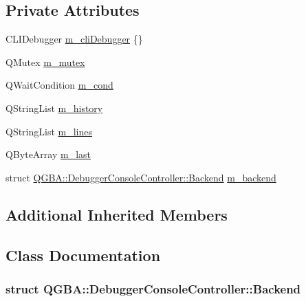 \subsection*{Private Attributes}
\begin{DoxyCompactItemize}
\item 
C\+L\+I\+Debugger \mbox{\hyperlink{class_q_g_b_a_1_1_debugger_console_controller_a8478029dc756b26ef415225ed61d18ff}{m\+\_\+cli\+Debugger}} \{\}
\item 
Q\+Mutex \mbox{\hyperlink{class_q_g_b_a_1_1_debugger_console_controller_a226ad563acafbfcb086defab145a7170}{m\+\_\+mutex}}
\item 
Q\+Wait\+Condition \mbox{\hyperlink{class_q_g_b_a_1_1_debugger_console_controller_a43988a77fa8a06372e9b94f6030b06d0}{m\+\_\+cond}}
\item 
Q\+String\+List \mbox{\hyperlink{class_q_g_b_a_1_1_debugger_console_controller_ab5ff5ce105d59435f616b429fe6ca0b5}{m\+\_\+history}}
\item 
Q\+String\+List \mbox{\hyperlink{class_q_g_b_a_1_1_debugger_console_controller_a05fed550c3eece88236ed0e3e3886ad1}{m\+\_\+lines}}
\item 
Q\+Byte\+Array \mbox{\hyperlink{class_q_g_b_a_1_1_debugger_console_controller_a3738efb4bd07c054e3cc04faece21e3a}{m\+\_\+last}}
\item 
struct \mbox{\hyperlink{class_q_g_b_a_1_1_debugger_console_controller_struct_q_g_b_a_1_1_debugger_console_controller_1_1_backend}{Q\+G\+B\+A\+::\+Debugger\+Console\+Controller\+::\+Backend}} \mbox{\hyperlink{class_q_g_b_a_1_1_debugger_console_controller_a88fed59f1d11fabe9270e808c75a1561}{m\+\_\+backend}}
\end{DoxyCompactItemize}
\subsection*{Additional Inherited Members}


\subsection{Class Documentation}
\label{struct_q_g_b_a_1_1_debugger_console_controller_1_1_backend}
\subsubsection{struct Q\+G\+BA\+:\+:Debugger\+Console\+Controller\+:\+:Backend}


